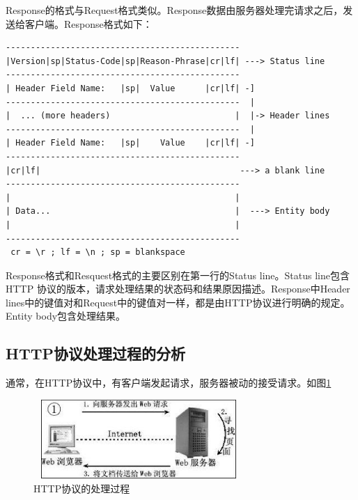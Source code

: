 \documentclass[12pt, twoside, a4paper, xetex]{report}
\begin{document}
 	Response的格式与Request格式类似。Response数据由服务器处理完请求之后，发送给客户端。Response格式如下：
\begin{verbatim}
-----------------------------------------------
|Version|sp|Status-Code|sp|Reason-Phrase|cr|lf| ---> Status line
-----------------------------------------------
| Header Field Name:   |sp|  Value      |cr|lf| -]
-----------------------------------------------  |
|  ... (more headers)                         |  |-> Header lines
-----------------------------------------------  |
| Header Field Name:   |sp|    Value    |cr|lf| -]
-----------------------------------------------
|cr|lf|                                        ---> a blank line
-----------------------------------------------
|                                             |
| Data...                                     |  ---> Entity body
|                                             |
-----------------------------------------------
 cr = \r ; lf = \n ; sp = blankspace
\end{verbatim}

 	Response格式和Resquest格式的主要区别在第一行的Status line。Status line包含HTTP 协议的版本，请求处理结果的状态码和结果原因描述。Response中Header lines中的键值对和Request中的键值对一样，都是由HTTP协议进行明确的规定。Entity body包含处理结果。
 	
\subsection{HTTP协议处理过程的分析}
	通常，在HTTP协议中，有客户端发起请求，服务器被动的接受请求。如图\ref{httpbaike}
	\begin{figure}[htbp]
	\centering
	\caption{HTTP协议的处理过程}
	\label{httpbaike}
	\includegraphics[height=3cm, width=8cm]{pics/httpbaike.eps}
	\end{figure}
	
\end{document}
